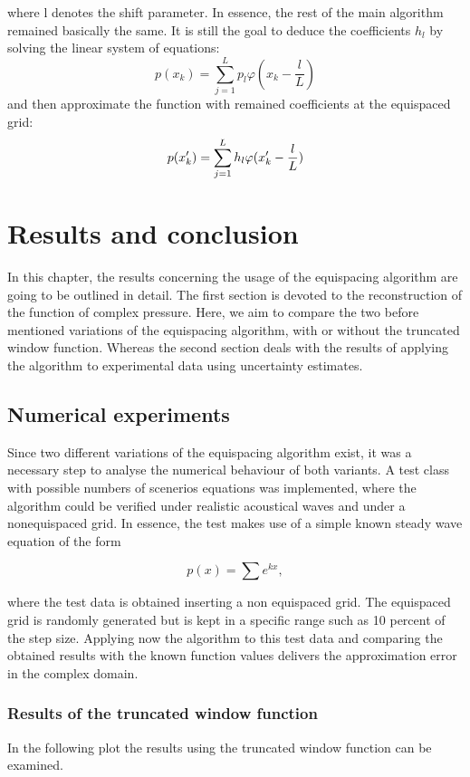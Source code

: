 \documentclass[11pt]{report} %
\begin{document}
where l denotes the shift parameter.
In essence, the rest of the main algorithm remained basically the same.
It is still the goal to deduce the coefficients $h_{l}$ by solving the linear system of equations: 
\begin{equation}
p(x_{k})=\sum\limits_{j=1}^L p_{l}\varphi(x_{k}-\frac{l}{L})
\end{equation}
and then approximate the function with remained coefficients at the equispaced grid: 
\begin{equation}
p(x'_{k})= \sum\limits_{j=1}^L h_{l}\varphi(x'_{k}-\frac{l}{L}) \notag
\end{equation}


\chapter{Results and conclusion}
In this chapter, the results concerning the usage of the equispacing algorithm are going to be outlined in detail. 
The first section is devoted to the reconstruction of the function of complex pressure.
Here, we aim to compare the two before mentioned variations of the equispacing algorithm, with or without the truncated window function. 
Whereas the second section deals with the results of applying the algorithm to experimental data using uncertainty estimates. 
 
\section{Numerical experiments}
Since two different variations of the equispacing algorithm exist, it was a necessary step to analyse the numerical behaviour of both variants.
A test class with possible numbers of scenerios equations was implemented, where the  
algorithm could be verified under realistic acoustical waves and under a nonequispaced grid.
In essence, the test makes use of a simple known steady wave equation of the form

\begin{equation}
p(x)= \sum e^{kx},
\end{equation}

where the test data is obtained inserting a non equispaced grid. 
The equispaced grid is randomly generated but is kept in a specific range such as 10 percent of the step size. 
Applying now the algorithm to this test data and comparing the obtained results with the known function values delivers the approximation error in the complex domain.

\subsection{Results of the truncated window function}
In the following plot the results using the truncated window function can be examined. 
\end{document}
